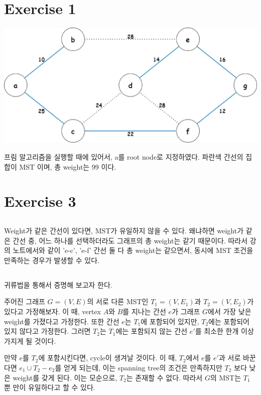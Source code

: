 \documentclass{article}
\begin{document}
\section{Exercise 1}
\begin{center}
    \includegraphics[scale=.4]{./img/prim_algo.eps}
\end{center}
프림 알고리즘을 실행할 때에 있어서, a를 root node로 지정하였다.
파란색 간선의 집합이 MST 이며, 총 weight는 99 이다.

\section{Exercise 3}
\subsection{}
Weight가 같은 간선이 있다면, MST가 유일하지 않을 수 있다. 왜냐하면 weight가 같은 간선 중, 어느 하나를 선택하더라도
그래프의 총 weight는 같기 때문이다. 따라서 강의 노트에서와 같이 'e-c', 'e-f' 간선 둘 다 총 weight는 같으면서, 동시에 MST 조건을 만족하는 경우가 발생할 수 있다.
\subsection{}
귀류법을 통해서 증명해 보고자 한다.

주어진 그래프 $G=(V, E)$의 서로 다른 MST인 $T_1 = (V, E_1)$과 $T_2 = (V, E_2)$가 있다고 가정해보자.
이 때, vertex $A$와 $B$를 지나는 간선 $e$가 그래프 $G$에서 가장 낮은 weight를 가졌다고 가정한다.
또한 간선 $e$는 $T_1$에 포함되어 있지만, $T_2$에는 포함되어 있지 않다고 가정한다.
그러면 $T_2$는 $T_1$에는 포함되지 않는 간선 $e'$를 최소한 한개 이상 가지게 될 것이다.

만약 $e$를 $T_2$에 포함시킨다면, cycle이 생겨날 것이다.
이 때, $T_2$에서 $e$를 $e'$과 서로 바꾼다면 $e_1 \cup T_2 - e_2$를 얻게 되는데, 이는 spanning tree의 조건은 만족하지만 $T_2$ 보다 낮은 weight를 갖게 된다.
이는 모순으로, $T_2$는 존재할 수 없다. 따라서 $G$의 MST는 $T_1$ 뿐 만이 유일하다고 할 수 있다.
\end{document}
